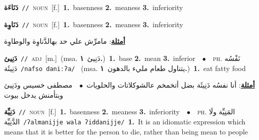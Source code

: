 \documentclass[10pt,a4paper,twoside]{article} %
\begin{document}
\begin{multicols}{2}
{\setlength\topsep{0pt}\textbf{\foreignlanguage{arabic}{دَنَاءَة}}\ {\color{gray}\texttt{//}\color{black}}\ \textsc{noun}\ [f.]\ \textbf{1.}~basenness  \textbf{2.}~meaness  \textbf{3.}~inferiority\ } \vspace{2mm}

{\setlength\topsep{0pt}\textbf{\foreignlanguage{arabic}{دَنَاوِة}}\ {\color{gray}\texttt{//}\color{black}}\ \textsc{noun}\ [f.]\ \textbf{1.}~basenness  \textbf{2.}~meaness  \textbf{3.}~inferiority\  \begin{flushright}\color{gray}\foreignlanguage{arabic}{\textbf{\underline{\foreignlanguage{arabic}{أمثلة}}}: مامرِّش علي حد بهالدَّناوِة والوطاوِة}\end{flushright}\color{black}} \vspace{2mm}

{\setlength\topsep{0pt}\textbf{\foreignlanguage{arabic}{دَنِيئ}}\ {\color{gray}\texttt{//}\color{black}}\ \textsc{adj}\ [m.]\ \color{gray}(msa. \foreignlanguage{arabic}{دَنِيئ}~\foreignlanguage{arabic}{\textbf{١.}})\color{black}\ \textbf{1.}~base  \textbf{2.}~mean  \textbf{3.}~inferior\ \ $\bullet$\ \ \textsc{ph.} \color{gray} \foreignlanguage{arabic}{نَفْسُه دَنِيئَة}\color{black}\ {\color{gray}\texttt{/{\sffamily nafso daniːʔa}/}\color{black}}\ \color{gray} (msa. \foreignlanguage{arabic}{يتناول طعام مليء بالدهون}~\foreignlanguage{arabic}{\textbf{١.}})\color{black}\ \textbf{1.}~eat fatty food\  \begin{flushright}\color{gray}\foreignlanguage{arabic}{\textbf{\underline{\foreignlanguage{arabic}{أمثلة}}}: أنا نفسُه دَنِيئَة بضل أتخمخم عالشوكلاتات والحلويات\ $\bullet$\ \  مصطفى خسيس ودَنِيئ وبتأمنش يدخل بيوت}\end{flushright}\color{black}} \vspace{2mm}

{\setlength\topsep{0pt}\textbf{\foreignlanguage{arabic}{دَنِيِّة}}\ {\color{gray}\texttt{//}\color{black}}\ \textsc{noun}\ [f.]\ \textbf{1.}~basenness  \textbf{2.}~meaness  \textbf{3.}~inferiority\ \ $\bullet$\ \ \textsc{ph.} \color{gray} \foreignlanguage{arabic}{المَنِيِّة ولَا الدَّنِيِّة}\color{black}\ {\color{gray}\texttt{/{\sffamily ʔalmanijje wala ʔiddanijje}/}\color{black}}\ \textbf{1.}~It is an idiomatic expression which means that it is better for the person to die, rather than being mean to people\ } \vspace{2mm}


\end{multicols}
\end{document}
